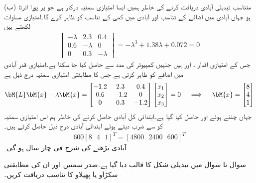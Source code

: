 (ب) متناسب تبدیلی آبادی دریافت کرنے کی خاطر ہمیں ایسا امتیازی سمتیہ  درکار ہے جو   پر پورا اترتا ہو جہاں  آبادی میں اضافے کے تناسب اور  آبادی میں کمی کے تناسب کو ظاہر کرے گا۔امتیازی مساوات لکھتے ہیں
\begin{align*}
\begin{vmatrix} -\lambda& 2.3&0.4\\0.6&-\lambda&0\\0&0.3&-\lambda \end{vmatrix}=-\lambda^3+1.38\lambda+0.072=0
\end{align*}
جس کے امتیازی اقدار ،  اور  ہیں جنہیں کمپیوٹر کی مدد سے حاصل کیا جا سکتا ہے۔امتیازی قدر  آبادی میں اضافے کو ظاہر کرتی ہے جس کا مطابقتی امتیازی سمتیہ درج ذیل ہے
\begin{align*}
\bM{L}\bM{x}-\lambda \bM{x}=\begin{bmatrix} -1.2&2.3&0.4\\0.6&-1.2&0\\0&0.3&-1.2 \end{bmatrix}\begin{bmatrix}x_1\\x_2\\x_3  \end{bmatrix}=0\quad \implies \quad \bM{x}=\begin{bmatrix} 8\\4\\1 \end{bmatrix}
\end{align*}
جہاں  چنتے ہوئے  اور  حاصل کیا گیا ہے۔ابتدائی کل آبادی  حاصل کرنے کی خاطر ہم اس امتیازی سمتیہ کو  سے ضرب دیتے ہوئے ابتدائی آبادی درج ذیل حاصل کرتے ہیں۔
\begin{align*}
600[8\,\,\,\,4\,\,\,\,1]^T=[4800\,\,\,\,2400\,\,\,\,600]^T
\end{align*}
 آبادی بڑھنے  کی شرح   فی  چار سال ہو گی۔

سوال  تا سوال  میں تبدیلی شکل  کا قالب  دیا گیا ہے۔صدر سمتیں اور ان کی مطابقتی سکڑاو یا پھیلاو کا تناسب دریافت کریں۔

